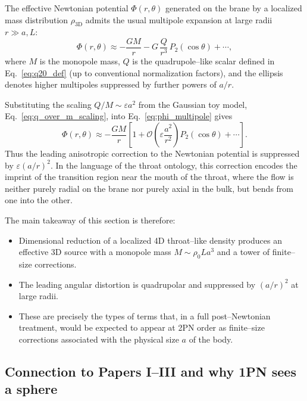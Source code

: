 \documentclass[12pt]{article}
\begin{document}
The effective Newtonian potential $\Phi(r,\theta)$ generated on the brane by
a localized mass distribution $\rho_{\mathrm{3D}}$ admits the usual
multipole expansion at large radii $r\gg a,L$:
\begin{equation}
  \Phi(r,\theta)
  \approx -\frac{GM}{r}
  - G\,\frac{Q}{r^3}\,P_2(\cos\theta)
  + \cdots,
  \label{eq:phi_multipole}
\end{equation}
where $M$ is the monopole mass, $Q$ is the quadrupole--like scalar defined
in Eq.~\eqref{eq:q20_def} (up to conventional normalization factors), and
the ellipsis denotes higher multipoles suppressed by further powers of
$a/r$.

Substituting the scaling $Q/M \sim \varepsilon a^2$ from the Gaussian toy
model, Eq.~\eqref{eq:q_over_m_scaling}, into Eq.~\eqref{eq:phi_multipole}
gives
\begin{equation}
  \Phi(r,\theta)
  \approx -\frac{GM}{r}
  \left[
    1
    + \mathcal{O}\!\left(
        \varepsilon \frac{a^2}{r^2}
      \right) P_2(\cos\theta)
    + \cdots
  \right].
  \label{eq:phi_farfield_scaling}
\end{equation}
Thus the leading anisotropic correction to the Newtonian potential is
suppressed by $\varepsilon(a/r)^2$.  In the language of the throat ontology,
this correction encodes the imprint of the transition region near the mouth
of the throat, where the flow is neither purely radial on the brane nor
purely axial in the bulk, but bends from one into the other.

The main takeaway of this section is therefore:
\begin{itemize}
  \item Dimensional reduction of a localized 4D throat--like density
        produces an effective 3D source with a monopole mass
        $M \sim \rho_0 L a^3$ and a tower of finite--size corrections.
  \item The leading angular distortion is quadrupolar and suppressed by
        $(a/r)^2$ at large radii.
  \item These are precisely the types of terms that, in a full post--Newtonian
        treatment, would be expected to appear at 2PN order as finite--size
        corrections associated with the physical size $a$ of the body.
\end{itemize}

\subsection{Connection to Papers I--III and why 1PN sees a sphere}
\label{subsec:connection_papers1to3}
\end{document}
